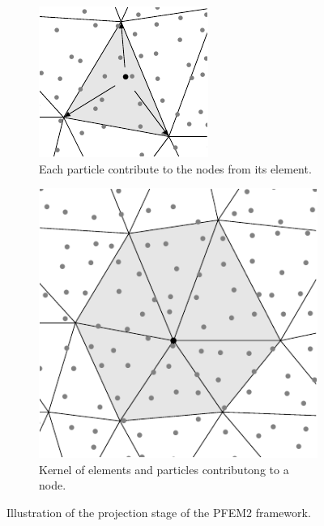 \begin{figure} [htb]
\begin{subfigure}{0.47\textwidth}
    \centering
    \includegraphics[width=\textwidth]{img/lagrangian/projection.pdf}
    \caption{Each particle contribute to the nodes from its element.}
    \label{pfem2_projection}
\end{subfigure}
\hfill
\begin{subfigure}{0.47\textwidth}
    \centering
    \includegraphics[width=\textwidth]{img/lagrangian/projection_full.pdf}
    \caption{Kernel of elements and particles contributong to a node.}
    \label{pfem2_projection_full}
\end{subfigure}
\caption{Illustration of the projection stage of the PFEM2 framework.}
\label{pfem2_projection_full_illustrations}
\end{figure}


